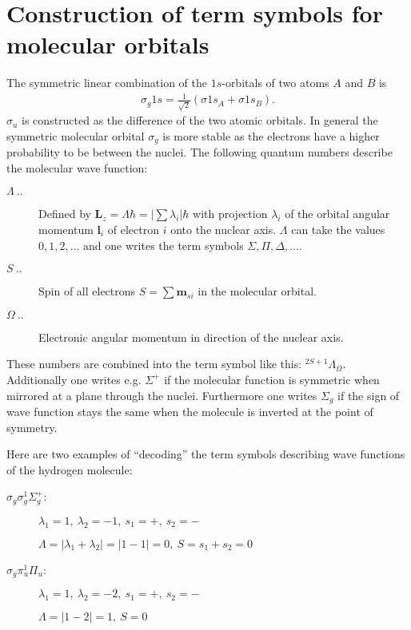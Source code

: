 \chapter{Construction of term symbols for molecular orbitals}
\label{sec:app_term}

The symmetric linear combination of the $1s$-orbitals of two atoms $A$
and $B$ is
\begin{align*}
  \sigma_g1s=\frac{1}{\sqrt2}(\sigma 1s_A+\sigma 1s_B).
\end{align*}
$\sigma_u$ is constructed as the difference of the two atomic
orbitals.  In general the symmetric molecular orbital $\sigma_g$ is
more stable as the electrons have a higher probability to be between
the nuclei.  The following quantum numbers describe the molecular wave
function:
\begin{description}
\item[$\Lambda\ ..$]
      
  Defined by $\mathbf{L}_z=\Lambda\hbar=|\sum\lambda_i|\hbar$ with
  projection $\lambda_i$ of the orbital angular momentum
  $\mathbf{l}_i$ of electron $i$ onto the nuclear axis. $\Lambda$ can
  take the values $0,1,2,\ldots$ and one writes the term symbols
  $\Sigma,\Pi,\Delta,\ldots$.
      
\item[$S\ ..$]
      
  Spin of all electrons $S=\sum\mathbf{m}_{si}$ in the molecular
  orbital.
      
\item[$\Omega\ ..$]
      
  Electronic angular momentum in direction of the nuclear axis.
      
\end{description}
These numbers are combined into the term symbol like this:
$\boxed{{}^{2S+1}\Lambda_\Omega}$.  Additionally one writes
e.g. $\Sigma^+$ if the molecular function is symmetric when mirrored
at a plane through the nuclei.  Furthermore one writes $\Sigma_g$ if
the sign of wave function stays the same when the molecule is inverted
at the point of symmetry.
    
Here are two examples of ``decoding'' the term symbols describing wave
functions of the hydrogen molecule:
    
\begin{description}
\item[$\sigma_g\sigma_g^1\Sigma_g^+$:]
      
  $\lambda_1=1,\ \lambda_2=-1,\ s_1=+,\ s_2=-$
      
  $\Lambda=|\lambda_1+\lambda_2|=|1-1|=0,\ S=s_1+s_2=0$
      
\item[$\sigma_g\pi_u^1\Pi_u$:]
      
  $\lambda_1=1,\ \lambda_2=-2,\ s_1=+,\ s_2=-$
      
  $\Lambda=|1-2|=1,\ S=0$
      
\end{description}
